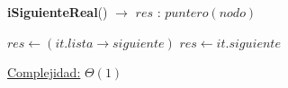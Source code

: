 \begin{Algoritmos}
\begin{algorithm}[H]
	\begin{algorithmic}
		\State \textbf{iSiguienteReal}() $\to$ $res$ : $puntero(nodo)$ 
			
			 
				\State $res \gets (it.lista\rightarrow siguiente)$
			\Else
				\State $res \gets it.siguiente$
			\EndIf
			
			\medskip
			\Statex \underline{Complejidad:} $\Theta(1)$
    	\end{algorithmic}
\end{algorithm}
\end{Algoritmos}
